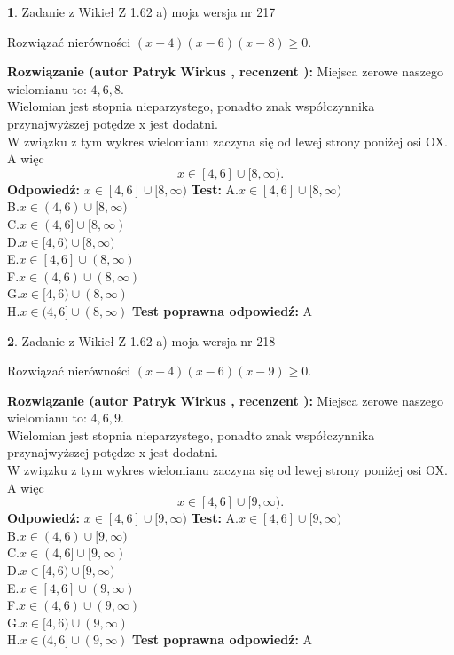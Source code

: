 \documentclass[12pt, a4paper]{article}
\theoremstyle{definition} %
\newtheorem{zad}{}
\newcommand{\zadStart}[1]{\begin{zad}#1\newline}
\newcommand{\zadStop}{\end{zad}}
\newcommand{\rozwStart}[2]{\noindent \textbf{Rozwiązanie (autor #1 , recenzent #2): }\newline}
\newcommand{\rozwStop}{\newline}
\newcommand{\odpStart}{\noindent \textbf{Odpowiedź:}\newline}
\newcommand{\odpStop}{\newline}
\newcommand{\testStart}{\noindent \textbf{Test:}\newline}
\newcommand{\testStop}{\newline}
\newcommand{\kluczStart}{\noindent \textbf{Test poprawna odpowiedź:}\newline}
\newcommand{\kluczStop}{\newline}
\begin{document}
\zadStart{Zadanie z Wikieł Z 1.62 a) moja wersja nr 217}

Rozwiązać nierówności $(x-4)(x-6)(x-8)\ge0$.
\zadStop
\rozwStart{Patryk Wirkus}{}
Miejsca zerowe naszego wielomianu to: $4, 6, 8$.\\
Wielomian jest stopnia nieparzystego, ponadto znak współczynnika przy\linebreak najwyższej potędze x jest dodatni.\\ W związku z tym wykres wielomianu zaczyna się od lewej strony poniżej osi OX. A więc $$x \in [4,6] \cup [8,\infty).$$
\rozwStop
\odpStart
$x \in [4,6] \cup [8,\infty)$
\odpStop
\testStart
A.$x \in [4,6] \cup [8,\infty)$\\
B.$x \in (4,6) \cup [8,\infty)$\\
C.$x \in (4,6] \cup [8,\infty)$\\
D.$x \in [4,6) \cup [8,\infty)$\\
E.$x \in [4,6] \cup (8,\infty)$\\
F.$x \in (4,6) \cup (8,\infty)$\\
G.$x \in [4,6) \cup (8,\infty)$\\
H.$x \in (4,6] \cup (8,\infty)$
\testStop
\kluczStart
A
\kluczStop



\zadStart{Zadanie z Wikieł Z 1.62 a) moja wersja nr 218}

Rozwiązać nierówności $(x-4)(x-6)(x-9)\ge0$.
\zadStop
\rozwStart{Patryk Wirkus}{}
Miejsca zerowe naszego wielomianu to: $4, 6, 9$.\\
Wielomian jest stopnia nieparzystego, ponadto znak współczynnika przy\linebreak najwyższej potędze x jest dodatni.\\ W związku z tym wykres wielomianu zaczyna się od lewej strony poniżej osi OX. A więc $$x \in [4,6] \cup [9,\infty).$$
\rozwStop
\odpStart
$x \in [4,6] \cup [9,\infty)$
\odpStop
\testStart
A.$x \in [4,6] \cup [9,\infty)$\\
B.$x \in (4,6) \cup [9,\infty)$\\
C.$x \in (4,6] \cup [9,\infty)$\\
D.$x \in [4,6) \cup [9,\infty)$\\
E.$x \in [4,6] \cup (9,\infty)$\\
F.$x \in (4,6) \cup (9,\infty)$\\
G.$x \in [4,6) \cup (9,\infty)$\\
H.$x \in (4,6] \cup (9,\infty)$
\testStop
\kluczStart
A
\kluczStop
\end{document}
